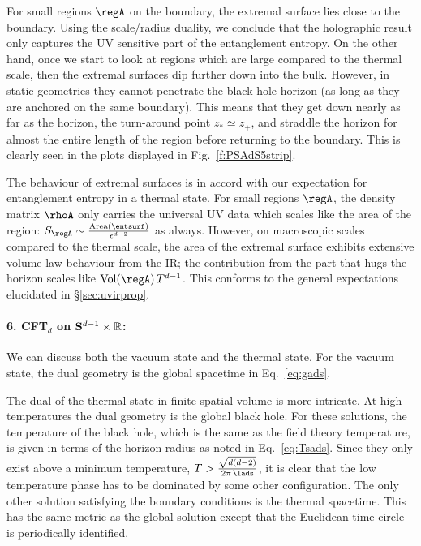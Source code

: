 \documentclass[12pt,openany]{book}
\begin{document}
For small regions $\regA$ on the boundary, the extremal surface lies close to the boundary. Using the scale/radius duality, we conclude that the holographic result only captures the UV sensitive part of the entanglement entropy. On the other hand, once we start to look at regions which are large compared to the thermal scale, then the extremal surfaces dip further down into the bulk. However, in static geometries they cannot penetrate the black hole horizon \cite{Hubeny:2012ry} (as long as they are anchored on the same boundary). This means that they get down nearly as far as the horizon, the turn-around point $z_* \simeq z_+$,  and straddle the horizon for almost the entire length of the region before returning to the boundary. This is clearly seen in the plots displayed in Fig.~\ref{f:PSAdS5strip}.

The behaviour of extremal surfaces is in accord with our expectation for entanglement entropy in a thermal state. For small regions $\regA$, the density matrix $\rhoA $ only carries the universal UV data which scales like the area of the region: $S_\regA \sim \frac{\text{Area}(\entsurf)}{\epsilon^{d-2}}$ as always. However, on macroscopic scales compared to the thermal scale, the area of the extremal surface exhibits extensive volume law behaviour from the IR; the contribution from the part that hugs the horizon scales like
$\text{Vol}(\regA) \, T^{d-1}$. This conforms to the general expectations elucidated in \S\ref{sec:uvirprop}.


\paragraph{6. CFT$_d$ on ${\bf S}^{d-1} \times {\mathbb R}$:} We can discuss both the vacuum state and the thermal state.  For the vacuum state, the dual geometry is the global  spacetime in Eq.~\eqref{eq:gads}.

The dual of the thermal state in finite spatial volume is more intricate. At high temperatures the dual geometry is the global  black hole. For these solutions, the temperature of the black hole, which is the same as the field theory temperature, is given in terms of the horizon radius as noted in Eq.~\eqref{eq:Tsads}. Since they only exist above  a minimum temperature, $T > \frac{\sqrt{d(d-2)}}{2\pi\, \lads} $, it is clear that the low temperature phase has to be dominated by some other configuration. The only other solution satisfying the boundary conditions is the thermal \AdS{} spacetime. This has the same metric as the global  solution except that the Euclidean time circle is periodically identified.
\end{document}
